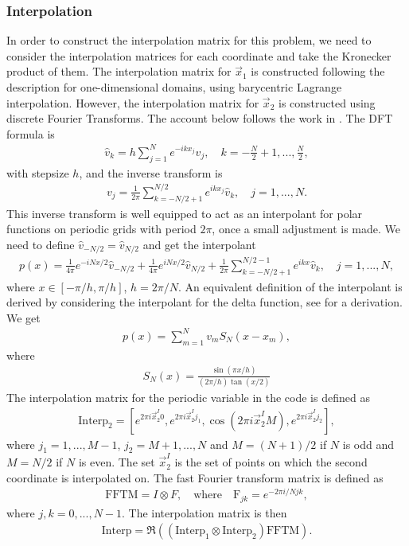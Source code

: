 \documentclass[11pt, a4paper]{article}
\theoremstyle{definition}
\begin{document}
\subsubsection{Interpolation}
In order to construct the interpolation matrix for this problem, we need to consider the interpolation matrices for each coordinate and take the Kronecker product of them.
The interpolation matrix for $\vec x_1$ is constructed following the description for one-dimensional domains, using barycentric Lagrange interpolation.
However, the interpolation matrix for $\vec x_2$ is constructed using discrete Fourier Transforms. The account below follows the work in \cite{bibTrefethen}.
The DFT formula is
\begin{align*}
	\hat v_k = h \sum_{j = 1}^{N} e^{-ikx_j} v_j, \quad k = - \frac{N}{2} + 1, ..., \frac{N}{2},
\end{align*}
with stepsize $h$, and the inverse transform is
\begin{align*}
	v_j = \frac{1}{2 \pi} \sum_{k = - N/2 +1}^{N/2} e^{i k x_j} \hat v_k, \quad j = 1, ..., N.
\end{align*}
This inverse transform is well equipped to act as an interpolant for polar functions on periodic grids with period $2\pi$, once a small adjustment is made. We need to define $\hat v_{-N/2} = \hat v_{N/2}$ and get the interpolant
\begin{align*}
	p(x) = \frac{1}{4 \pi} e^{- i N x/2} \hat v_{-N/2} + \frac{1}{4 \pi} e^{i N x/2} \hat v_{N/2} + \frac{1}{2 \pi} \sum_{k = - N/2 + 1}^{N/2 - 1} e^{i k x} \hat v_k, \quad j = 1, ..., N,
\end{align*}
where $x \in [-\pi/h, \pi/h]$, $h = 2\pi /N$.
An equivalent definition of the interpolant is derived by considering the interpolant for the delta function, see \cite{bibTrefethen} for a derivation.
We get
\begin{align*}
	p(x) = \sum_{m = 1}^N v_m S_N(x -x_m), 
\end{align*}
where
\begin{align}\label{eq:PeriodicInterpolant}
	S_N(x) = \frac{\sin(\pi x /h)}{(2 \pi /h)\tan(x/2)}
\end{align}
The interpolation matrix for the periodic variable in the code is defined as
\begin{align*}
	\text{Interp}_{2} = \left[e^{2\pi i \vec {x}_2^{I} 0}, e^{2\pi i \vec {x}_2^{I} j_1}, \cos(2\pi i \vec {x}_2^{I} M) ,e^{2\pi i \vec {x}_2^{I} j_2}\right],
\end{align*} 
where $j_1 = 1,..., M-1$, $j_2 = M + 1,..., N$ and $M = (N + 1) /2$ if $N$ is odd and $M = N /2$ if $N$ is even. The set $\vec {x}_2^{I}$ is the set of points on which the second coordinate is interpolated on.
The fast Fourier transform matrix is defined as
\begin{align*}
	\text{FFTM} = I \otimes F, \quad \text{where} \quad	\text{F}_{jk} =  e^{- 2 \pi i / N jk},
\end{align*}
where $j, k = 0,..., N -1$.
The interpolation matrix is then
\begin{align*}
	\text{Interp} = \Re\left(\left(\text{Interp}_{1} \otimes \text{Interp}_{2}\right) \text{FFTM}\right).
\end{align*}
\end{document}
